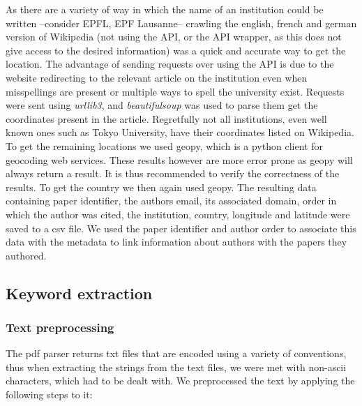\documentclass[article,twocolumn]{IEEEtran}
\begin{document}
As there are a variety of way in which the name of an institution could
be written --consider EPFL, EPF Lausanne-- crawling the english, french
and german version of Wikipedia (not using the API, or the API wrapper,
as this does not give access to the desired information) was a quick and
accurate way to get the location. The advantage of sending requests over
using the API is due to the website redirecting to the relevant article
on the institution even when misspellings are present or multiple ways
to spell the university exist. Requests were sent using \emph{urllib3},
and \emph{beautifulsoup} was used to parse them get the coordinates
present in the article. Regretfully not all institutions, even well
known ones such as Tokyo University, have their coordinates listed on
Wikipedia. To get the remaining locations we used geopy, which is a
python client for geocoding web services. These results however are more
error prone as geopy will always return a result. It is thus recommended
to verify the correctness of the results. To get the country we then
again used geopy. The resulting data containing paper identifier, the
authors email, its associated domain, order in which the author was
cited, the institution, country, longitude and latitude were saved to a
csv file. We used the paper identifier and author order to associate
this data with the metadata to link information about authors with the
papers they authored.

    \hypertarget{keyword-extraction}{%
\subsection{Keyword extraction}\label{keyword-extraction}}

    \hypertarget{text-preprocessing}{%
\subsubsection{Text preprocessing}\label{text-preprocessing}}

    The pdf parser returns txt files that are encoded using a variety of
conventions, thus when extracting the strings from the text files, we
were met with non-ascii characters, which had to be dealt with. We
preprocessed the text by applying the following steps to it:
\end{document}
